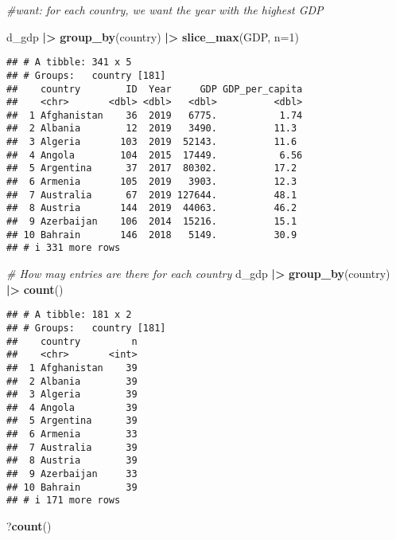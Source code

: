 \documentclass[
]{article}
\newenvironment{Shaded}{\begin{snugshade}}{\end{snugshade}}
\newcommand{\AttributeTok}[1]{\textcolor[rgb]{0.13,0.29,0.53}{#1}}
\newcommand{\CommentTok}[1]{\textcolor[rgb]{0.56,0.35,0.01}{\textit{#1}}}
\newcommand{\DecValTok}[1]{\textcolor[rgb]{0.00,0.00,0.81}{#1}}
\newcommand{\FunctionTok}[1]{\textcolor[rgb]{0.13,0.29,0.53}{\textbf{#1}}}
\newcommand{\NormalTok}[1]{#1}
\newcommand{\SpecialCharTok}[1]{\textcolor[rgb]{0.81,0.36,0.00}{\textbf{#1}}}
\begin{document}
\begin{Shaded}
\begin{Highlighting}[]
\CommentTok{\#want: for each country, we want the year with the highest GDP}

\NormalTok{d\_gdp }\SpecialCharTok{|\textgreater{}}
  \FunctionTok{group\_by}\NormalTok{(country) }\SpecialCharTok{|\textgreater{}}
  \FunctionTok{slice\_max}\NormalTok{(GDP, }\AttributeTok{n=}\DecValTok{1}\NormalTok{)}
\end{Highlighting}
\end{Shaded}

\begin{verbatim}
## # A tibble: 341 x 5
## # Groups:   country [181]
##    country        ID  Year     GDP GDP_per_capita
##    <chr>       <dbl> <dbl>   <dbl>          <dbl>
##  1 Afghanistan    36  2019   6775.           1.74
##  2 Albania        12  2019   3490.          11.3 
##  3 Algeria       103  2019  52143.          11.6 
##  4 Angola        104  2015  17449.           6.56
##  5 Argentina      37  2017  80302.          17.2 
##  6 Armenia       105  2019   3903.          12.3 
##  7 Australia      67  2019 127644.          48.1 
##  8 Austria       144  2019  44063.          46.2 
##  9 Azerbaijan    106  2014  15216.          15.1 
## 10 Bahrain       146  2018   5149.          30.9 
## # i 331 more rows
\end{verbatim}

\begin{Shaded}
\begin{Highlighting}[]
\CommentTok{\# How may entries are there for each country}
\NormalTok{d\_gdp }\SpecialCharTok{|\textgreater{}}
  \FunctionTok{group\_by}\NormalTok{(country) }\SpecialCharTok{|\textgreater{}}
  \FunctionTok{count}\NormalTok{()}
\end{Highlighting}
\end{Shaded}

\begin{verbatim}
## # A tibble: 181 x 2
## # Groups:   country [181]
##    country         n
##    <chr>       <int>
##  1 Afghanistan    39
##  2 Albania        39
##  3 Algeria        39
##  4 Angola         39
##  5 Argentina      39
##  6 Armenia        33
##  7 Australia      39
##  8 Austria        39
##  9 Azerbaijan     33
## 10 Bahrain        39
## # i 171 more rows
\end{verbatim}

\begin{Shaded}
\begin{Highlighting}[]
\NormalTok{?}\FunctionTok{count}\NormalTok{()}
\end{Highlighting}
\end{Shaded}
\end{document}
